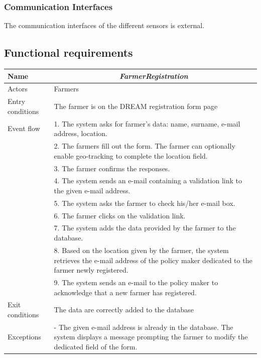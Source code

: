 \subsubsection{Communication Interfaces}
The communication interfaces of the different sensors is external.
\subsection{Functional requirements}
\begin{table}[H]
	\centering
	\begin{tabularx}{\linewidth}{|l|X|}
		\hline
		Name & \multicolumn{1}{c|}{\textit{\textbf{FarmerRegistration}}}                                                   \tabularnewline \hline
		Actors                                               & Farmers                                                    \tabularnewline \hline
		Entry conditions                                              & The farmer is on the DREAM registration form page                                                                                  \tabularnewline \hline
		Event flow                                         & 1.	The system asks for farmer’s data: name, surname, e-mail address, location.                                                                    \tabularnewline 
		& 2.	The farmers fill out the form. The farmer can optionally enable geo-tracking to complete the location field.                                                   \tabularnewline 
		& 3.	The farmer confirms the responses.                                                   \tabularnewline 
		& 4.	The system sends an e-mail containing a validation link to the given e-mail address.                                                \tabularnewline
		& 5.	The system asks the farmer to check his/her e-mail box.                                               \tabularnewline
		& 6.	The farmer clicks on the validation link.                                     \tabularnewline
		& 7.	The system adds the data provided by the farmer to the database.                                  \tabularnewline
		& 8.	Based on the location given by the farmer, the system retrieves the e-mail address of the policy maker dedicated to the farmer newly registered.                               \tabularnewline
		& 9.	The system sends an e-mail to the policy maker to acknowledge that a new farmer has registered.                              \tabularnewline \hline
		Exit conditions & The data are correctly added to the database
		\tabularnewline \hline
		Exceptions & 
		-	The given e-mail address is already in the database. The system displays a message prompting the farmer to modify the dedicated field of the form.  \tabularnewline
		

\end{tabularx}
\end{table}
